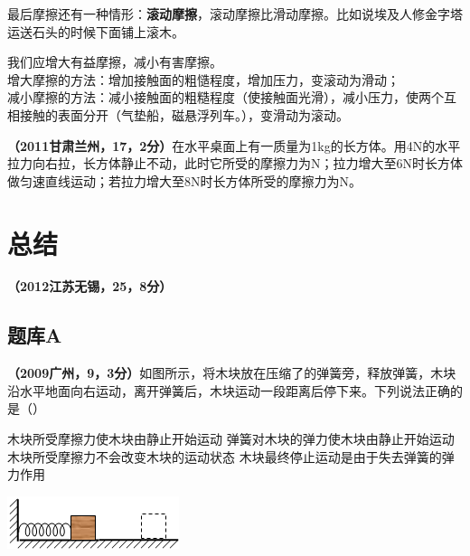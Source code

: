 \documentclass[12pt,twoside]{exam}
\begin{document}
\begin{knowledge}
最后摩擦还有一种情形：\textbf{滚动摩擦}，滚动摩擦比滑动摩擦。比如说埃及人修金字塔运送石头的时候下面铺上滚木。

我们应增大有益摩擦，减小有害摩擦。\\
增大摩擦的方法：增加接触面的粗慥程度，增加压力，变滚动为滑动；\\
减小摩擦的方法：减小接触面的粗糙程度（使接触面光滑），减小压力，使两个互相接触的表面分开（气垫船，磁悬浮列车。），变滑动为滚动。

\textbf{（2011甘肃兰州，17，2分）}在水平桌面上有一质量为1kg的长方体。用4N的水平拉力向右拉，长方体静止不动，此时它所受的摩擦力为\answerline*[4]N；拉力增大至6N时长方体做匀速直线运动；若拉力增大至8N时长方体所受的摩擦力为\answerline*[6]N。




\section{总结}


\textbf{（2012江苏无锡，25，8分）}



\end{knowledge}





\begin{Aquestions}
\newpage
\section{题库A}
\begin{questions}
\question
\textbf{（2009广州，9，3分）}如图所示，将木块放在压缩了的弹簧旁，释放弹簧，木块沿水平地面向右运动，离开弹簧后，木块运动一段距离后停下来。下列说法正确的是（\answerline*[B]）

\noindent
\begin{minipage}{\textwidth}
\begin{minipage}[c][6cm][c]{0.7\textwidth}
\begin{choices}
\choice 木块所受摩擦力使木块由静止开始运动
\choice 弹簧对木块的弹力使木块由静止开始运动
\choice 木块所受摩擦力不会改变木块的运动状态
\choice 木块最终停止运动是由于失去弹簧的弹力作用
\end{choices}
\end{minipage}\hfill
\begin{minipage}[c][6cm][c]{0.3\textwidth}
\includegraphics[scale=0.8]{figures/2009广州9.png} 
\end{minipage} 
\end{minipage} 


\end{questions}
\end{Aquestions}









%
\end{document}
